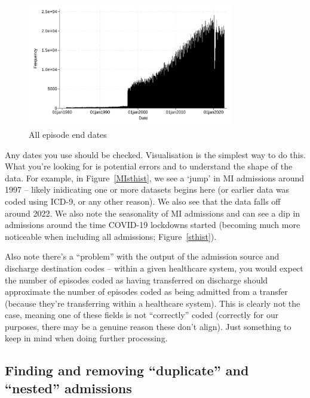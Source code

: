 \documentclass[11pt]{article}
\begin{document}
\begin{figure}[h!]
    \centering
    \caption{All episode end dates}
    \label{enhist}
    \includegraphics[width=0.8\textwidth]{HA_log/16_3.pdf}
\end{figure}
\begin{stlog}\end{stlog}
\color{black}

Any dates you use should be checked. Visualisation is the simplest way to do this. 
What you're looking for is potential errors and to understand the shape of the data. 
For example, in Figure~\ref{MIsthist}, we see a `jump' in MI admissions around 1997 --
likely inidicating one or more datasets begins here (or earlier data
was coded using ICD-9, or any other reason). We also see that the data falls off
around 2022. We also note the seasonality of MI admissions and can see a
dip in admissions around the time COVID-19 lockdowns started (becoming much more 
noticeable when including all admissions; Figure~\ref{sthist}). 

Also note there's a ``problem'' with the output of the admission source and discharge destination
codes -- within a given healthcare system, you would expect the number of episodes coded as 
having transferred on discharge should approximate the number of episodes coded as being admitted from a 
transfer (because they're transferring within a healthcare system). This is clearly not the case,
meaning one of these fields is not ``correctly'' coded (correctly for our purposes, 
there may be a genuine reason these don't align). Just something to keep in mind
when doing further processing. 

\clearpage
\subsection{Finding and removing ``duplicate'' and ``nested'' admissions}
\end{document}
